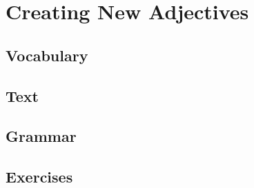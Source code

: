 \chapter{Creating New Adjectives}
\section*{Vocabulary}
\section*{Text}
\section*{Grammar}
\section*{Exercises}

